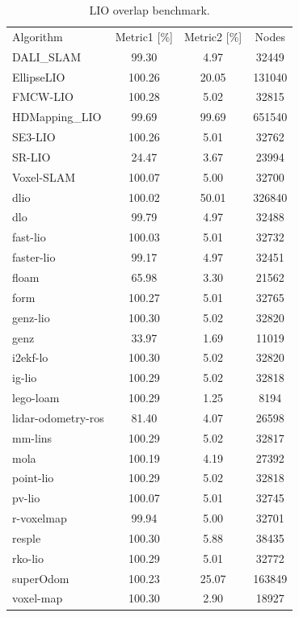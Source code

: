 \begin{table}[]
\centering
\begin{tabular}{lccc}
\rowcolor[HTML]{C0C0C0}
Algorithm & Metric1 [\%] & Metric2 [\%] & Nodes \\
DALI_SLAM & 99.30 & 4.97 & 32449 \\
EllipseLIO & 100.26 & 20.05 & 131040 \\
FMCW-LIO & 100.28 & 5.02 & 32815 \\
HDMapping_LIO & 99.69 & 99.69 & 651540 \\
SE3-LIO & 100.26 & 5.01 & 32762 \\
SR-LIO & 24.47 & 3.67 & 23994 \\
Voxel-SLAM & 100.07 & 5.00 & 32700 \\
dlio & 100.02 & 50.01 & 326840 \\
dlo & 99.79 & 4.97 & 32488 \\
fast-lio & 100.03 & 5.01 & 32732 \\
faster-lio & 99.17 & 4.97 & 32451 \\
floam & 65.98 & 3.30 & 21562 \\
form & 100.27 & 5.01 & 32765 \\
genz-lio & 100.30 & 5.02 & 32820 \\
genz & 33.97 & 1.69 & 11019 \\
i2ekf-lo & 100.30 & 5.02 & 32820 \\
ig-lio & 100.29 & 5.02 & 32818 \\
lego-loam & 100.29 & 1.25 & 8194 \\
lidar-odometry-ros & 81.40 & 4.07 & 26598 \\
mm-lins & 100.29 & 5.02 & 32817 \\
mola & 100.19 & 4.19 & 27392 \\
point-lio & 100.29 & 5.02 & 32818 \\
pv-lio & 100.07 & 5.01 & 32745 \\
r-voxelmap & 99.94 & 5.00 & 32701 \\
resple & 100.30 & 5.88 & 38435 \\
rko-lio & 100.29 & 5.01 & 32772 \\
superOdom & 100.23 & 25.07 & 163849 \\
voxel-map & 100.30 & 2.90 & 18927 \\
\end{tabular}
\caption{LIO overlap benchmark.}
\label{tab:lio_overlap}
\end{table}